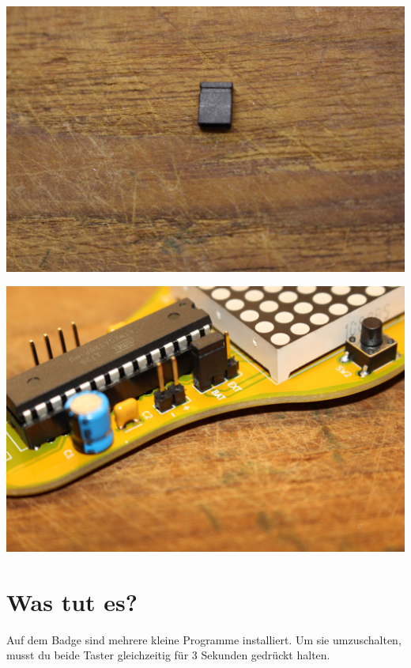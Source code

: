 \documentclass{article}
\begin{document}
\begin{minipage}[b]{0.5\textwidth}
	\includegraphics[width=\textwidth]{Bilder/IMG_5629.JPG}
\end{minipage}
\begin{minipage}[b]{0.5\textwidth}
	\includegraphics[width=\textwidth]{Bilder/IMG_5634.JPG}
\end{minipage}

\section{Was tut es?}

Auf dem Badge sind mehrere kleine Programme installiert. Um sie umzuschalten, musst du beide Taster gleichzeitig für 3 Sekunden gedrückt halten.



\end{document}
